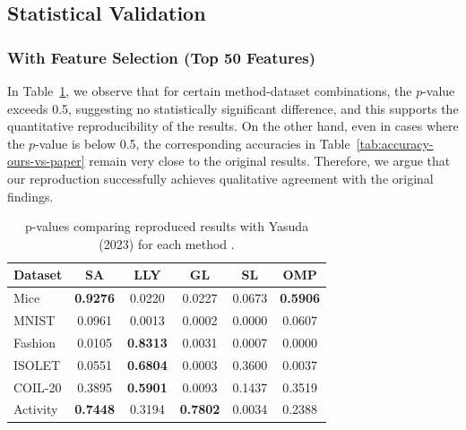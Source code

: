 \documentclass[a4paper,twocolumn]{article} %
\begin{document}
\subsection{Statistical Validation}
\subsubsection*{With Feature Selection (Top 50 Features)}
In Table~\ref{tab:methodwise-pval}, we observe that for certain method-dataset combinations, the $p$-value exceeds 0.5, suggesting no statistically significant difference, and this supports the quantitative reproducibility of the results. On the other hand, even in cases where the $p$-value is below 0.5, the corresponding accuracies in Table~\ref{tab:accuracy-ours-vs-paper} remain very close to the original results. Therefore, we argue that our reproduction successfully achieves qualitative agreement with the original findings.
\begin{table}[ht]
\centering
\scriptsize
\caption{p-values comparing reproduced results with Yasuda (2023) for each method .}
\begin{tabular}{lccccc}
\hline
\textbf{Dataset} & \textbf{SA} & \textbf{LLY} & \textbf{GL} & \textbf{SL} & \textbf{OMP} \\
\hline
Mice     & \textbf{0.9276} & 0.0220 & 0.0227 & 0.0673 & \textbf{0.5906} \\
MNIST    & 0.0961 & 0.0013 & 0.0002 & 0.0000 & 0.0607 \\
Fashion  & 0.0105 & \textbf{0.8313} & 0.0031 & 0.0007 & 0.0000 \\
ISOLET   & 0.0551 & \textbf{0.6804} & 0.0003 & 0.3600 & 0.0037 \\
COIL-20  & 0.3895 & \textbf{0.5901} & 0.0093 & 0.1437 & 0.3519 \\
Activity & \textbf{0.7448} & 0.3194 & \textbf{0.7802} & 0.0034 & 0.2388 \\
\hline
\end{tabular}
\label{tab:methodwise-pval}
\end{table}
\end{document}
